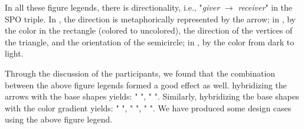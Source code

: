 In all these figure legends, there is directionality, i.e., "\textit{giver} $\rightarrow$ \textit{receiver}" in the SPO triple. In , the direction is metaphorically represented by the arrow; in , by the color in the rectangle (colored to uncolored), the direction of the vertices of the triangle, and the orientation of the semicircle; in , by the color from dark to light.

Through the discussion of the participants, we found that the combination between the above figure legends formed a good effect as well.  hybridizing the arrows with the base shapes yields: "  ", "  ". Similarly,  hybridizing the base shapes with the color gradient yields: "  ", "  ", "  ".
We have produced some design cases using the above figure legend.


